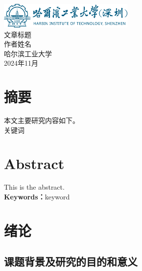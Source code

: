 \documentclass[14pt]{article}
\begin{document}
\begin{titlepage}
    \begin{center}
        \includegraphics[width=0.5\textwidth]{hitsz.png}\\
        \vspace{8cm}
        {\heiti{}文章标题}\\
        \vspace{1.5cm}
        {\heiti{}作者姓名}\\
        \vspace{6cm}
        {哈尔滨工业大学}\\
        2024年11月
    \end{center}
\end{titlepage}

\newpage
{}
\tableofcontents

\newpage
\section*{摘要}
\par
本文主要研究内容如下。\\
关键词

\newpage
\section*{Abstract}
\par
This is the abstract.\\
\noindent \textbf{Keywords：}keyword

\newpage
{}
\section{绪论}
\subsection{课题背景及研究的目的和意义}
\end{document}
